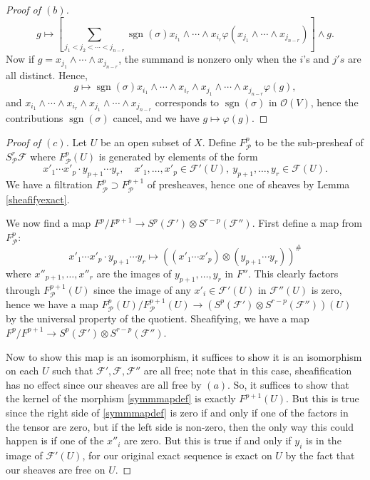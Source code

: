 \documentclass[12pt,letterpaper]{article}
\theoremstyle{definition}
\theoremstyle{remark}
\numberwithin{equation}{section}
\numberwithin{figure}{problem}
\DeclareMathOperator{\sgn}{sgn}
\newcommand{\FF}{\mathscr{F}}
\newcommand{\OO}{\mathcal{O}}
\newcommand{\PP}{\mathcal{P}}
\begin{document}
\begin{proof}[Proof of $(b)$]
\begin{equation*}
    g \mapsto \left[ \sum_{j_1 < j_2 < \cdots < j_{n-r}}\sgn(\sigma)x_{i_1}\wedge\cdots\wedge x_{i_r}\varphi(x_{j_1} \wedge \cdots \wedge x_{j_{n-r}}) \right] \wedge g.
  \end{equation*}
  Now if $g = x_{j_1} \wedge \cdots \wedge x_{j_{n-r}}$, the summand is nonzero only when the $i$'s and $j's$ are all distinct. Hence,
  \begin{equation*}
    g \mapsto \sgn(\sigma) x_{i_1}\wedge\cdots\wedge x_{i_r} \wedge x_{j_1} \wedge \cdots \wedge x_{j_{n-r}} \varphi(g),
  \end{equation*}
  and $x_{i_1}\wedge\cdots\wedge x_{i_r} \wedge x_{j_1} \wedge \cdots \wedge x_{j_{n-r}}$ corresponds to $\sgn(\sigma)$ in $\OO(V)$, hence the contributions $\sgn(\sigma)$ cancel, and we have $g \mapsto \varphi(g)$.
\end{proof}
\begin{proof}[Proof of $(c)$]
  Let $U$ be an open subset of $X$. Define $F^p_{\PP}$ to be the sub-presheaf of $S^r_\PP \FF$ where $F^p_\PP(U)$ is generated by elements of the form
  \begin{equation*}
    x'_1 \cdots x'_p \cdot y_{p+1} \cdots y_r, \quad x'_1,\ldots,x'_p \in \FF'(U),~y_{p+1},\ldots,y_r \in \FF(U).
  \end{equation*}
  We have a filtration $F^p_\PP \supset F^{p+1}_\PP$ of presheaves, hence one of sheaves by Lemma \ref{sheafifyexact}.
  \par We now find a map $F^p/F^{p+1} \to S^p(\FF') \otimes S^{r-p}(\FF'')$. First define a map from $F^p_\PP$:
  \begin{equation}\label{symmmapdef}
    x'_1 \cdots x'_p \cdot y_{p+1} \cdots y_r \mapsto \left((x'_1 \cdots x'_p) \otimes (y_{p+1} \cdots y_r)\right)^\#
  \end{equation}
  where $x''_{p+1},\ldots,x''_r$ are the images of $y_{p+1},\ldots,y_r$ in $F''$. This clearly factors through $F_\PP^{p+1}(U)$ since the image of any $x'_i \in \FF'(U)$ in $\FF''(U)$ is zero, hence we have a map $F^p_\PP(U)/F^{p+1}_\PP(U) \to (S^p(\FF') \otimes S^{r-p}(\FF''))(U)$ by the universal property of the quotient. Sheafifying, we have a map $F^p/F^{p+1} \to S^p(\FF') \otimes S^{r-p}(\FF'')$.
  \par Now to show this map is an isomorphism, it suffices to show it is an isomorphism on each $U$ such that $\FF',\FF,\FF''$ are all free; note that in this case, sheafification has no effect since our sheaves are all free by $(a)$. So, it suffices to show that the kernel of the morphism \eqref{symmmapdef} is exactly $F^{p+1}(U)$. But this is true since the right side of \eqref{symmmapdef} is zero if and only if one of the factors in the tensor are zero, but if the left side is non-zero, then the only way this could happen is if one of the $x''_i$ are zero. But this is true if and only if $y_i$ is in the image of $\FF'(U)$, for our original exact sequence is exact on $U$ by the fact that our sheaves are free on $U$.
\end{proof}
\end{document}

